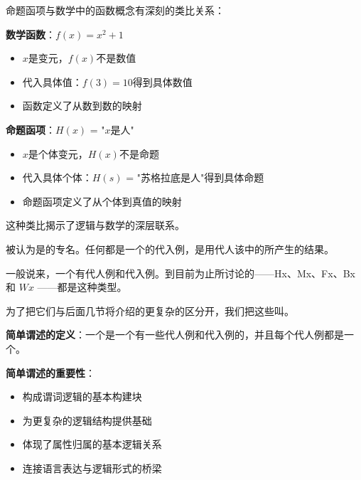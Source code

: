 \begin{examplebox}[title=命题函项的数学类比]
命题函项与数学中的函数概念有深刻的类比关系：

\textbf{数学函数}：$f(x) = x^2 + 1$
\begin{itemize}
\item $x$是变元，$f(x)$不是数值
\item 代入具体值：$f(3) = 10$得到具体数值
\item 函数定义了从数到数的映射
\end{itemize}

\textbf{命题函项}：$H(x)$ = "$x$是人"
\begin{itemize}
\item $x$是个体变元，$H(x)$不是命题
\item 代入具体个体：$H(s)$ = "苏格拉底是人"得到具体命题
\item 命题函项定义了从个体到真值的映射
\end{itemize}

这种类比揭示了逻辑与数学的深层联系。
\end{examplebox}

被认为是的专名。任何都是一个的代入例，是用代人该中的所产生的结果。\cite{reichenbach1947}

\begin{theorembox}[title=简单谓述的特征]
一般说来，一个有代人例和代入例。到目前为止所讨论的——Hx、Mx、Fx、Bx 和 $W x$ ——都是这种类型。

为了把它们与后面几节将介绍的更复杂的区分开，我们把这些叫。

\textbf{简单谓述的定义}：一个是一个有一些代人例和代入例的，并且每个代人例都是一个。

\textbf{简单谓述的重要性}：
\begin{itemize}
\item 构成谓词逻辑的基本构建块
\item 为更复杂的逻辑结构提供基础
\item 体现了属性归属的基本逻辑关系
\item 连接语言表达与逻辑形式的桥梁
\end{itemize}
\end{theorembox}

